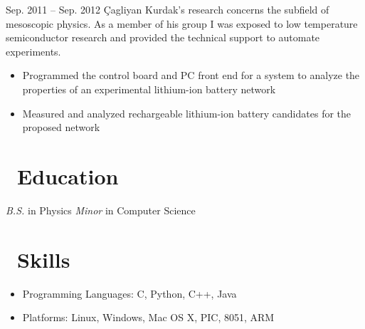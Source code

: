 \documentclass{resume}
\begin{document}
          {Sep. 2011 -- Sep. 2012}
Çagliyan Kurdak's research concerns the subfield of mesoscopic physics. As a
member of his group I was exposed to low temperature semiconductor research and
provided the technical support to automate experiments.
\begin{itemize}
  \item Programmed the control board and PC front end for a system to analyze the
      properties of an experimental lithium-ion battery network
  \item Measured and analyzed rechargeable lithium-ion battery candidates for the
      proposed network
\end{itemize}

\section{\faGraduationCap\ Education}
\textit{B.S.} in Physics
\newline
\textit{Minor} in Computer Science

\section{\faCogs\ Skills}
\begin{itemize}[parsep=0.5ex]
  \item Programming Languages: C, Python, C++, Java
  \item Platforms: Linux, Windows, Mac OS X, PIC, 8051, ARM
\end{itemize}
\end{document}
